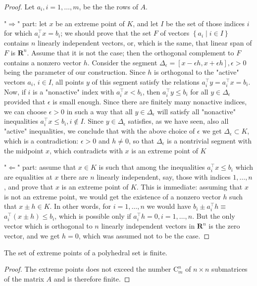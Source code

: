 \documentclass{article}
\begin{document}
\begin{proof}\color{ForestGreen}
Let $a_{i}, i=1, \ldots, m$, be the the rows of $A$.

"$\Rightarrow$" part: let $x$ be an extreme point of $K$, and let $I$ be the set of those indices $i$ for which $a_{i}^{\top} x=b_{i}$; we should prove that the set $F$ of vectors $\left\{a_{i} \mid i \in I\right\}$ contains $n$ linearly independent vectors, or, which is the same, that linear span of $F$ is $\mathbf{R}^{n}$. Assume that it is not the case; then the orthogonal complement to $F$ contains a nonzero vector $h$. Consider the segment $\Delta_{\epsilon}=[x-\epsilon h, x+\epsilon h], \epsilon>0$ being the parameter of our construction. Since $h$ is orthogonal to the "active" vectors $a_{i}$, $i \in I$, all points $y$ of this segment satisfy the relations $a_{i}^{\top} y=a_{i}^{\top} x=b_{i}$. Now, if $i$ is a "nonactive" index with $a_{i}^{\top} x<b_{i}$, then $a_{i}^{\top} y \leq b_{i}$ for all $y \in \Delta_{\epsilon}$ provided that $\epsilon$ is small enough. Since there are finitely many nonactive indices, we can choose $\epsilon>0$ in such a way that all $y \in \Delta_{\epsilon}$ will satisfy all "nonactive" inequalities $a_{i}^{\top} x \leq b_{i}, i \notin I$. Since $y \in \Delta_{\epsilon}$ satisfies, as we have seen, also all "active" inequalities, we conclude that with the above choice of $\epsilon$ we get $\Delta_{\epsilon} \subset K$, which is a contradiction: $\epsilon>0$ and $h \neq 0$, so that $\Delta_{\epsilon}$ is a nontrivial segment with the midpoint $x$, which contradicts with $x$ is an extreme point of $K$

"$\Leftarrow$" part: assume that $x \in K$ is such that among the inequalities $a_{i}^{\top} x \leq b_{i}$ which are equalities at $x$ there are $n$ linearly independent, say, those with indices $1, \ldots, n$, and prove that $x$ is an extreme point of $K$. This is immediate: assuming that $x$ is not an extreme point, we would get the existence of a nonzero vector $h$ such that $x \pm h \in K .$ In other words, for $i=1, \ldots, n$ we would have $b_{i} \pm a_{i}^{\top} h \equiv$ $a_{i}^{\top}(x \pm h) \leq b_{i}$, which is possible only if $a_{i}^{\top} h=0, i=1, \ldots, n .$ But the only vector which is orthogonal to $n$ linearly independent vectors in $\mathbf{R}^{n}$ is the zero vector, and we get $h=0$, which was assumed not to be the case.
\end{proof}
\begin{cora}
The set of extreme points of a polyhedral set is finite.
\end{cora}
\begin{proof}\color{ForestGreen}
The extreme points does not exceed the number $\mathrm{C}_{m}^{n}$ of $n \times n$ submatrices of the matrix $A$ and is therefore finite.
\end{proof}
\end{document}
